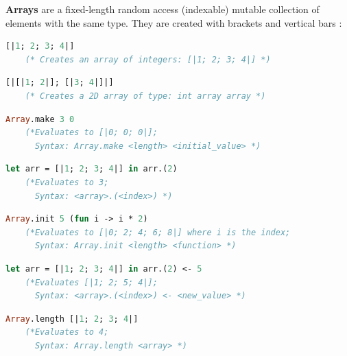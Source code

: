 \newpage

\vfill

\begin{Def}

    \textbf{Arrays} are a fixed-length random access (indexable) mutable collection of elements with the same type.
    They are created with brackets and vertical bars \snippet{[| |]}:
    \begin{lstlisting}[language=OCaml, caption={Defining and Modifying an Array}, numbers=none]
    [|1; 2; 3; 4|]
    (* Creates an array of integers: [|1; 2; 3; 4|] *)
    \end{lstlisting}

    \begin{lstlisting}[language=OCaml, caption={2D Array}, numbers=none]
    [|[|1; 2|]; [|3; 4|]|]
    (* Creates a 2D array of type: int array array *)    
    \end{lstlisting}

    \begin{lstlisting}[language=OCaml, caption={Arrays.make: Prefill Length Array}, numbers=none]
    Array.make 3 0
    (*Evaluates to [|0; 0; 0|]; 
      Syntax: Array.make <length> <initial_value> *)
    \end{lstlisting}

    \begin{lstlisting}[language=OCaml, caption={Accessing Array Elements}, numbers=none]
    let arr = [|1; 2; 3; 4|] in arr.(2)
    (*Evaluates to 3; 
      Syntax: <array>.(<index>) *)
    \end{lstlisting}

    \begin{lstlisting}[language=OCaml, caption={Arrays.init: Creating Array with Function}, numbers=none]
    Array.init 5 (fun i -> i * 2)
    (*Evaluates to [|0; 2; 4; 6; 8|] where i is the index; 
      Syntax: Array.init <length> <function> *)
    \end{lstlisting}

    \begin{lstlisting}[language=OCaml, caption={Mutating Array Elements}, numbers=none]
    let arr = [|1; 2; 3; 4|] in arr.(2) <- 5
    (*Evaluates [|1; 2; 5; 4|]; 
      Syntax: <array>.(<index>) <- <new_value> *)
    \end{lstlisting}

    \begin{lstlisting}[language=OCaml, caption={Length of Array}, numbers=none]
    Array.length [|1; 2; 3; 4|]
    (*Evaluates to 4; 
      Syntax: Array.length <array> *)
    \end{lstlisting}
\end{Def}

